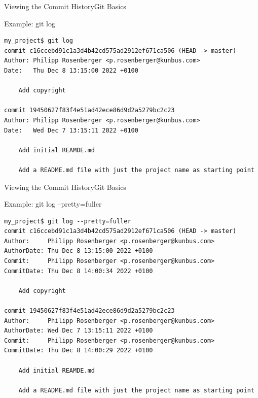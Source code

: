 \documentclass[aspectratio=169]{beamer}
\renewcommand{\footnotesize}{\tiny}
\begin{document}
\begin{frame}[fragile]{Viewing the Commit History}{Git Basics}
\begin{block}{Example: \ttfamily git log}
\begin{verbatim}
my_project$ git log
commit c16ccebd91c1a3d4b42cd575ad2912ef671ca506 (HEAD -> master)
Author: Philipp Rosenberger <p.rosenberger@kunbus.com>
Date:   Thu Dec 8 13:15:00 2022 +0100

    Add copyright

commit 19450627f83f4e51ad42ece86d9d2a5279bc2c23
Author: Philipp Rosenberger <p.rosenberger@kunbus.com>
Date:   Wed Dec 7 13:15:11 2022 +0100

    Add initial REAMDE.md
    
    Add a README.md file with just the project name as starting point

\end{verbatim}
\end{block}
\end{frame}

\begin{frame}[fragile]{Viewing the Commit History}{Git Basics}
\begin{block}{Example: \ttfamily git log --pretty=fuller}
\begin{verbatim}
my_project$ git log --pretty=fuller 
commit c16ccebd91c1a3d4b42cd575ad2912ef671ca506 (HEAD -> master)
Author:     Philipp Rosenberger <p.rosenberger@kunbus.com>
AuthorDate: Thu Dec 8 13:15:00 2022 +0100
Commit:     Philipp Rosenberger <p.rosenberger@kunbus.com>
CommitDate: Thu Dec 8 14:00:34 2022 +0100

    Add copyright

commit 19450627f83f4e51ad42ece86d9d2a5279bc2c23
Author:     Philipp Rosenberger <p.rosenberger@kunbus.com>
AuthorDate: Wed Dec 7 13:15:11 2022 +0100
Commit:     Philipp Rosenberger <p.rosenberger@kunbus.com>
CommitDate: Thu Dec 8 14:00:29 2022 +0100

    Add initial REAMDE.md
    
    Add a README.md file with just the project name as starting point
\end{verbatim}
\end{block}
\end{frame}
\end{document}
